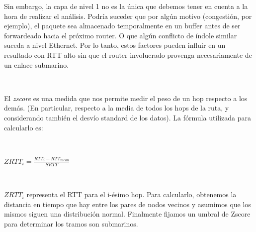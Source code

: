 Sin embargo, la capa de nivel 1 no es la \'unica que debemos tener en cuenta a la hora de realizar el
an\'alisis. Podr\'ia suceder que por alg\'un motivo (congesti\'on, por ejemplo), el paquete sea almacenado
temporalmente en un buffer antes de ser forwardeado hacia el pr\'oximo router. O que alg\'un conflicto
de \'indole similar suceda a nivel Ethernet. Por lo tanto, estos factores pueden influir
en un resultado con RTT alto sin que el router involucrado provenga necesariamente de un enlace
submarino.

~

El \emph{zscore} es una medida que nos permite medir el peso de un hop respecto a los dem\'as. (En
particular, respecto a la media de todos los hops de la ruta, y considerando tambi\'en el desv\'io
standard de los datos).
La f\'ormula utilizada para calcularlo es:

~

$ZRTT_{i} = \frac{RTT_{i} - RTT_{mean}}{SRTT}$

~

$ZRTT_{i}$ representa el RTT para el i-\'esimo hop. Para calcularlo, obtenemos la distancia en tiempo
que hay entre los pares de nodos vecinos y asumimos que los
mismos siguen una distribuci\'on normal.
Finalmente fijamos un umbral de Zscore para determinar los tramos
son submarinos.
